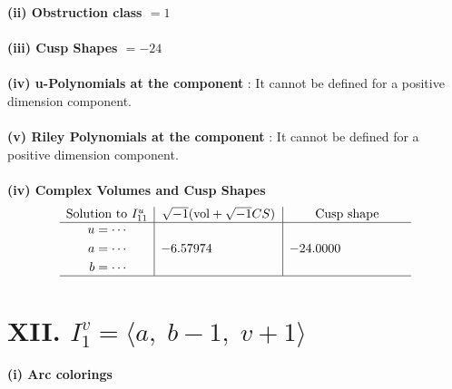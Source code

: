 \documentclass[1p]{elsarticle_modified}
\theoremstyle{definition}
\newcommand{\I}{\sqrt{-1}}
\begin{document}
\flushleft \textbf{(ii) Obstruction class $= 1$}\\~\\
\flushleft \textbf{(iii) Cusp Shapes $= -24$}\\~\\
\flushleft \textbf{(iv) u-Polynomials at the component} : It cannot be defined for a positive dimension component.\\~\\
\flushleft \textbf{(v) Riley Polynomials at the component} : It cannot be defined for a positive dimension component.\\~\\
\newpage\flushleft \textbf{(iv) Complex Volumes and Cusp Shapes}
$$\begin{array}{c|c|c} 
\text{Solution to }I^u_{11}& \I (\text{vol} + \sqrt{-1}CS) & \text{Cusp shape}\\
 \hline 
\begin{aligned}
u &= \cdots \\
a &= \cdots \\
b &= \cdots\end{aligned}
 & -6.57974\phantom{ +0.000000I} & -24.0000\phantom{ +0.000000I}\\
 \hline 
 \end{array}
$$\newpage\renewcommand{\arraystretch}{1}
\centering \section*{XII. $I^v_{1}= \langle a,\;b-1,\;v+1 \rangle$}
\flushleft \textbf{(i) Arc colorings}\\
\end{document}
